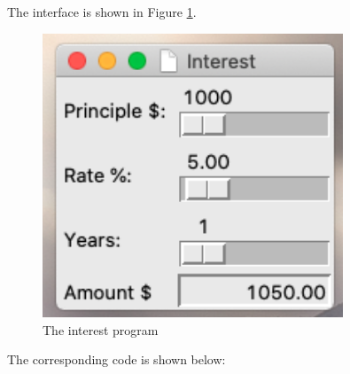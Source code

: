 The interface is shown in Figure \ref{fig:interest}.
\begin{figure}[!ht]
  \centering
  \includegraphics[width=0.8\textwidth]{pics/interest}
  \caption{The interest program}
  \label{fig:interest}
\end{figure}

The corresponding code is shown below:


